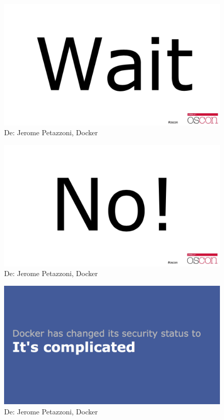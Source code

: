 \documentclass{bredelebeamer}
\begin{document}
\begin{frame}
	\begin{figure}
		\centering
		\includegraphics[width=\textwidth,height=0.8\textheight,keepaspectratio]{images/oscon4}
		\caption{De: Jerome Petazzoni, Docker}
	\end{figure}
\end{frame}
\begin{frame}
	\begin{figure}
		\centering
		\includegraphics[width=\textwidth,height=0.8\textheight,keepaspectratio]{images/oscon5}
		\caption{De: Jerome Petazzoni, Docker}
	\end{figure}
\end{frame}

\begin{frame}
	\begin{figure}
		\centering
		\includegraphics[width=\textwidth,height=0.8\textheight,keepaspectratio]{images/oscon6}
		\caption{De: Jerome Petazzoni, Docker}
	\end{figure}
\end{frame}
\end{document}
